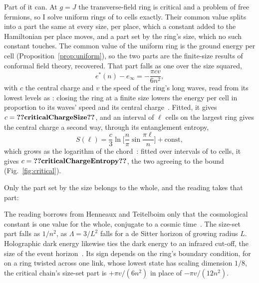 \documentclass[aps,prd,reprint,superscriptaddress]{revtex4-2}
\begin{document}
Part of it can. At $g = J$ the transverse-field ring is critical and a problem of free fermions, so I solve uniform rings of  to  cells exactly. Their common value splits into a part the same at every size,  per place, which a constant added to the Hamiltonian per place moves, and a part set by the ring's size, which no such constant touches. The common value of the uniform ring is the ground energy per cell (Proposition~\ref{prop:uniform}), so the two parts are the finite-size results of conformal field theory, recovered. That part falls as one over the size squared,
\begin{equation}
  e^*(n) - e_\infty = -\frac{\pi c v}{6 n^2},
  \label{eq:casimir}
\end{equation}
with $c$ the central charge and $v$ the speed of the ring's long waves, read from its lowest levels as : closing the ring at a finite size lowers the energy per cell in proportion to its waves' speed and its central charge~\cite{BloteCardyNightingale1986,Affleck1986}. Fitted, it gives $c = \val{criticalChargeSize}$, and an interval of $\ell$ cells on the largest ring gives the central charge a second way, through its entanglement entropy,
\begin{equation}
  S(\ell) = \frac{c}{3} \ln\!\Big[\frac{n}{\pi} \sin\frac{\pi \ell}{n}\Big] + \text{const},
  \label{eq:chord}
\end{equation}
which grows as the logarithm of the chord~\cite{CalabreseCardy2004}: fitted over intervals of  to  cells, it gives $c = \val{criticalChargeEntropy}$, the two agreeing to the bound  (Fig.~\ref{fig:critical}).

Only the part set by the size belongs to the whole, and the reading takes that part:


The reading borrows from Henneaux and Teitelboim only that the cosmological constant is one value for the whole, conjugate to a cosmic time~\cite{HenneauxTeitelboim1989}. The size-set part falls as $1/n^2$, as $\Lambda = 3/L^2$ falls for a de Sitter horizon of growing radius $L$. Holographic dark energy likewise ties the dark energy to an infrared cut-off, the size of the event horizon~\cite{Li2004}. Its sign depends on the ring's boundary condition, for on a ring twisted across one link, whose lowest state has scaling dimension $1/8$, the critical chain's size-set part is $+\pi v/(6n^2)$ in place of $-\pi v/(12 n^2)$.
\end{document}
